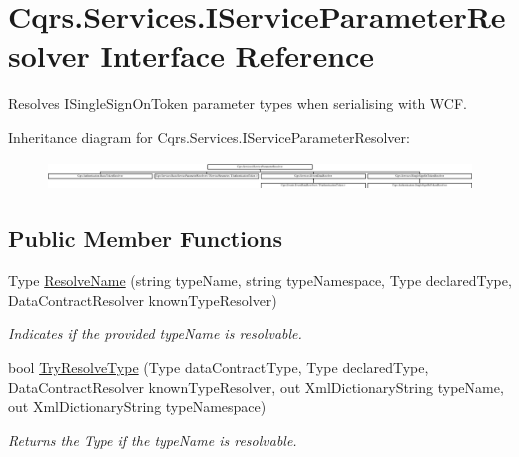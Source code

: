 \hypertarget{interfaceCqrs_1_1Services_1_1IServiceParameterResolver}{}\section{Cqrs.\+Services.\+I\+Service\+Parameter\+Resolver Interface Reference}
\label{interfaceCqrs_1_1Services_1_1IServiceParameterResolver}


Resolves I\+Single\+Sign\+On\+Token parameter types when serialising with W\+CF.  


Inheritance diagram for Cqrs.\+Services.\+I\+Service\+Parameter\+Resolver\+:\begin{figure}[H]
\begin{center}
\leavevmode
\includegraphics[height=0.763636cm]{interfaceCqrs_1_1Services_1_1IServiceParameterResolver}
\end{center}
\end{figure}
\subsection*{Public Member Functions}
\begin{DoxyCompactItemize}
\item 
Type \hyperlink{interfaceCqrs_1_1Services_1_1IServiceParameterResolver_a37c4b53616192e4e2f15ab4661ab99ae_a37c4b53616192e4e2f15ab4661ab99ae}{Resolve\+Name} (string type\+Name, string type\+Namespace, Type declared\+Type, Data\+Contract\+Resolver known\+Type\+Resolver)
\begin{DoxyCompactList}\small\item\em Indicates if the provided {\itshape type\+Name}  is resolvable. \end{DoxyCompactList}\item 
bool \hyperlink{interfaceCqrs_1_1Services_1_1IServiceParameterResolver_a31c82a00b192b877faff6df99e1b689b_a31c82a00b192b877faff6df99e1b689b}{Try\+Resolve\+Type} (Type data\+Contract\+Type, Type declared\+Type, Data\+Contract\+Resolver known\+Type\+Resolver, out Xml\+Dictionary\+String type\+Name, out Xml\+Dictionary\+String type\+Namespace)
\begin{DoxyCompactList}\small\item\em Returns the Type if the {\itshape type\+Name}  is resolvable. \end{DoxyCompactList}\end{DoxyCompactItemize}



